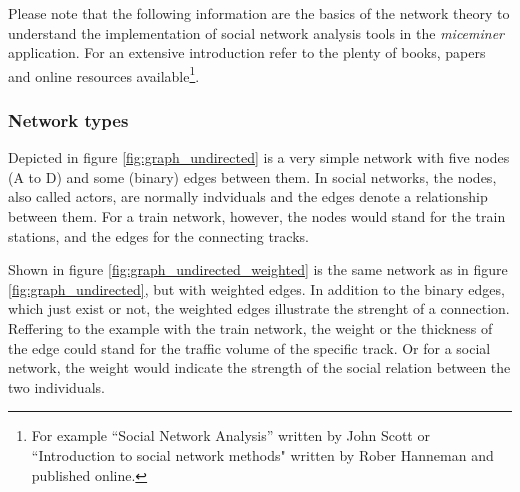 Please note that the following information are the basics of the network theory to understand the implementation of social network analysis tools in the \textit{miceminer} application. For an extensive introduction refer to the plenty of books, papers and online resources available\footnote{For example ``Social Network Analysis'' written by John Scott\cite{scott:00} or ``Introduction to social network methods" written by Rober Hanneman\cite{hanneman:05} and published online.}.

\subsubsection{Network types}
\label{subsubsec:net_types}
Depicted in figure \ref{fig:graph_undirected} is a very simple network with five nodes (A to D) and some (binary) edges between them. In social networks, the nodes, also called actors, are normally indviduals and the edges denote a relationship between them. For a train network, however, the nodes would stand for the train stations, and the edges for the connecting tracks.

Shown in figure \ref{fig:graph_undirected_weighted} is the same network as in figure \ref{fig:graph_undirected}, but with weighted edges. In addition to the binary edges, which just exist or not, the weighted edges illustrate the strenght of a connection. Reffering to the example with the train network, the weight or the thickness of the edge could stand for the traffic volume of the specific track. Or for a social network, the weight would indicate the strength of the social relation between the two individuals.  

